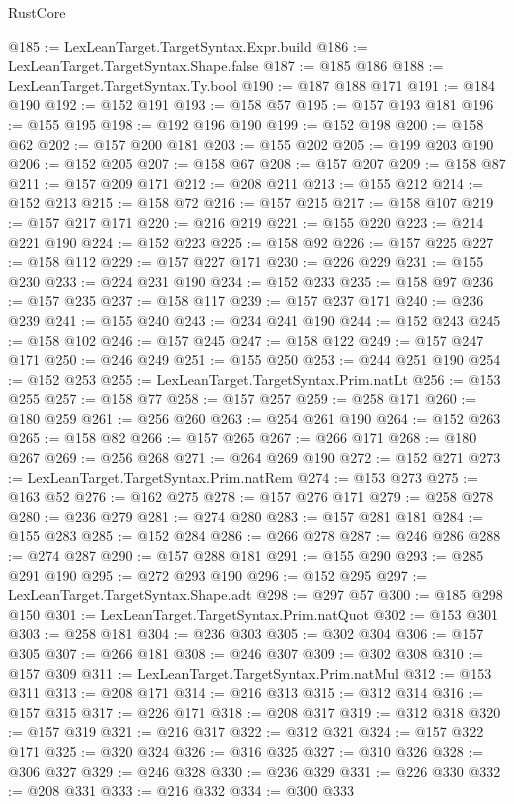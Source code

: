 \begin{lexlean}{RustCore}
\begin{coremodule}
@185 := LexLeanTarget.TargetSyntax.Expr.build
@186 := LexLeanTarget.TargetSyntax.Shape.false
@187 := @185 @186
@188 := LexLeanTarget.TargetSyntax.Ty.bool
@190 := @187 @188 @171
@191 := @184 @190
@192 := @152 @191
@193 := @158 @57
@195 := @157 @193 @181
@196 := @155 @195
@198 := @192 @196 @190
@199 := @152 @198
@200 := @158 @62
@202 := @157 @200 @181
@203 := @155 @202
@205 := @199 @203 @190
@206 := @152 @205
@207 := @158 @67
@208 := @157 @207
@209 := @158 @87
@211 := @157 @209 @171
@212 := @208 @211
@213 := @155 @212
@214 := @152 @213
@215 := @158 @72
@216 := @157 @215
@217 := @158 @107
@219 := @157 @217 @171
@220 := @216 @219
@221 := @155 @220
@223 := @214 @221 @190
@224 := @152 @223
@225 := @158 @92
@226 := @157 @225
@227 := @158 @112
@229 := @157 @227 @171
@230 := @226 @229
@231 := @155 @230
@233 := @224 @231 @190
@234 := @152 @233
@235 := @158 @97
@236 := @157 @235
@237 := @158 @117
@239 := @157 @237 @171
@240 := @236 @239
@241 := @155 @240
@243 := @234 @241 @190
@244 := @152 @243
@245 := @158 @102
@246 := @157 @245
@247 := @158 @122
@249 := @157 @247 @171
@250 := @246 @249
@251 := @155 @250
@253 := @244 @251 @190
@254 := @152 @253
@255 := LexLeanTarget.TargetSyntax.Prim.natLt
@256 := @153 @255
@257 := @158 @77
@258 := @157 @257
@259 := @258 @171
@260 := @180 @259
@261 := @256 @260
@263 := @254 @261 @190
@264 := @152 @263
@265 := @158 @82
@266 := @157 @265
@267 := @266 @171
@268 := @180 @267
@269 := @256 @268
@271 := @264 @269 @190
@272 := @152 @271
@273 := LexLeanTarget.TargetSyntax.Prim.natRem
@274 := @153 @273
@275 := @163 @52
@276 := @162 @275
@278 := @157 @276 @171
@279 := @258 @278
@280 := @236 @279
@281 := @274 @280
@283 := @157 @281 @181
@284 := @155 @283
@285 := @152 @284
@286 := @266 @278
@287 := @246 @286
@288 := @274 @287
@290 := @157 @288 @181
@291 := @155 @290
@293 := @285 @291 @190
@295 := @272 @293 @190
@296 := @152 @295
@297 := LexLeanTarget.TargetSyntax.Shape.adt
@298 := @297 @57
@300 := @185 @298 @150
@301 := LexLeanTarget.TargetSyntax.Prim.natQuot
@302 := @153 @301
@303 := @258 @181
@304 := @236 @303
@305 := @302 @304
@306 := @157 @305
@307 := @266 @181
@308 := @246 @307
@309 := @302 @308
@310 := @157 @309
@311 := LexLeanTarget.TargetSyntax.Prim.natMul
@312 := @153 @311
@313 := @208 @171
@314 := @216 @313
@315 := @312 @314
@316 := @157 @315
@317 := @226 @171
@318 := @208 @317
@319 := @312 @318
@320 := @157 @319
@321 := @216 @317
@322 := @312 @321
@324 := @157 @322 @171
@325 := @320 @324
@326 := @316 @325
@327 := @310 @326
@328 := @306 @327
@329 := @246 @328
@330 := @236 @329
@331 := @226 @330
@332 := @208 @331
@333 := @216 @332
@334 := @300 @333

\end{coremodule}
\end{lexlean}

